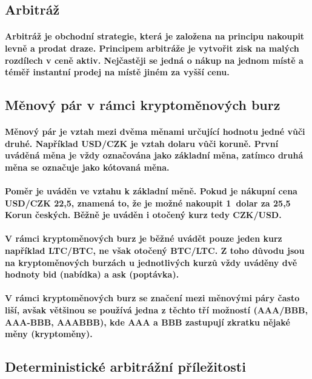 \documentclass[thesis=B,czech]{FITthesis}[2019/03/21]
\begin{document}
\subsection{Arbitráž}
\paragraph{
Arbitráž je obchodní strategie, která je založena na principu nakoupit levně a prodat draze. Principem arbitráže je vytvořit zisk na malých rozdílech v ceně aktiv. Nejčastěji se jedná o nákup na jednom místě a téměř instantní prodej na místě jiném za vyšší cenu. \cite{Capital}
}
\subsection{Měnový pár v rámci kryptoměnových burz}
\paragraph{
Měnový pár je vztah mezi dvěma měnami určující hodnotu jedné vůči druhé. Například USD/CZK je vztah dolaru vůči koruně. První uváděná měna je vždy označována jako základní měna, zatímco druhá měna se označuje jako kótovaná měna. \cite{Capital_menovy_par} 
} 
\paragraph{
Poměr je uváděn ve vztahu k základní měně. Pokud je nákupní cena USD/CZK 22,5, znamená to, že je možné nakoupit 1~dolar za 25,5~ Korun českých. Běžně je uváděn i otočený kurz tedy CZK/USD. \cite{Capital_menovy_par} 
}
\paragraph{
V rámci kryptoměnových burz je běžné uvádět pouze jeden kurz například LTC/BTC, ne však otočený BTC/LTC. Z toho důvodu jsou na kryptoměnových burzách u jednotlivých kurzů vždy uváděny dvě hodnoty bid (nabídka) a ask (poptávka). 
}
\paragraph{
V rámci kryptoměnových burz se značení mezi měnovými páry často liší, avšak většinou se používá jedna z těchto tří možností (AAA/BBB, AAA-BBB, AAABBB), kde AAA a BBB zastupují zkratku nějaké měny (kryptoměny).
}
\subsection{Deterministické arbitrážní příležitosti}
\end{document}
